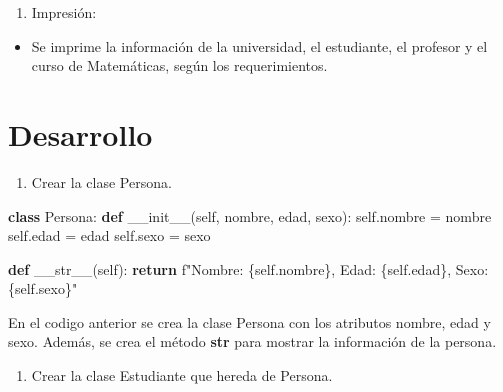 \documentclass[
  a4paper,
  DIV=11,
  numbers=noendperiod,
  onepage,
  openany]{scrreprt}
\newenvironment{Shaded}{\begin{snugshade}}{\end{snugshade}}
\newcommand{\ControlFlowTok}[1]{\textcolor[rgb]{0.00,0.23,0.31}{\textbf{#1}}}
\newcommand{\FunctionTok}[1]{\textcolor[rgb]{0.28,0.35,0.67}{#1}}
\newcommand{\KeywordTok}[1]{\textcolor[rgb]{0.00,0.23,0.31}{\textbf{#1}}}
\newcommand{\NormalTok}[1]{\textcolor[rgb]{0.00,0.23,0.31}{#1}}
\newcommand{\OperatorTok}[1]{\textcolor[rgb]{0.37,0.37,0.37}{#1}}
\newcommand{\SpecialCharTok}[1]{\textcolor[rgb]{0.37,0.37,0.37}{#1}}
\newcommand{\SpecialStringTok}[1]{\textcolor[rgb]{0.13,0.47,0.30}{#1}}
\newcommand{\VariableTok}[1]{\textcolor[rgb]{0.07,0.07,0.07}{#1}}
\providecommand{\tightlist}{%
  \setlength{\itemsep}{0pt}\setlength{\parskip}{0pt}}\usepackage{longtable,booktabs,array}
\begin{document}
\begin{enumerate}
\def\labelenumi{\arabic{enumi}.}
\setcounter{enumi}{6}
\tightlist
\item
  Impresión:
\end{enumerate}

\begin{itemize}
\tightlist
\item
  Se imprime la información de la universidad, el estudiante, el
  profesor y el curso de Matemáticas, según los requerimientos.
\end{itemize}

\section{Desarrollo}\label{desarrollo-2}

\begin{enumerate}
\def\labelenumi{\arabic{enumi}.}
\tightlist
\item
  Crear la clase Persona.
\end{enumerate}

\begin{Shaded}
\begin{Highlighting}[]
\KeywordTok{class}\NormalTok{ Persona:}
    \KeywordTok{def} \FunctionTok{\_\_init\_\_}\NormalTok{(}\VariableTok{self}\NormalTok{, nombre, edad, sexo):}
        \VariableTok{self}\NormalTok{.nombre }\OperatorTok{=}\NormalTok{ nombre}
        \VariableTok{self}\NormalTok{.edad }\OperatorTok{=}\NormalTok{ edad}
        \VariableTok{self}\NormalTok{.sexo }\OperatorTok{=}\NormalTok{ sexo}

    \KeywordTok{def} \FunctionTok{\_\_str\_\_}\NormalTok{(}\VariableTok{self}\NormalTok{):}
        \ControlFlowTok{return} \SpecialStringTok{f"Nombre: }\SpecialCharTok{\{}\VariableTok{self}\SpecialCharTok{.}\NormalTok{nombre}\SpecialCharTok{\}}\SpecialStringTok{, Edad: }\SpecialCharTok{\{}\VariableTok{self}\SpecialCharTok{.}\NormalTok{edad}\SpecialCharTok{\}}\SpecialStringTok{, Sexo: }\SpecialCharTok{\{}\VariableTok{self}\SpecialCharTok{.}\NormalTok{sexo}\SpecialCharTok{\}}\SpecialStringTok{"}
\end{Highlighting}
\end{Shaded}

En el codigo anterior se crea la clase Persona con los atributos nombre,
edad y sexo. Además, se crea el método \textbf{\textbf{str}} para
mostrar la información de la persona.

\begin{enumerate}
\def\labelenumi{\arabic{enumi}.}
\setcounter{enumi}{1}
\tightlist
\item
  Crear la clase Estudiante que hereda de Persona.
\end{enumerate}
\end{document}
